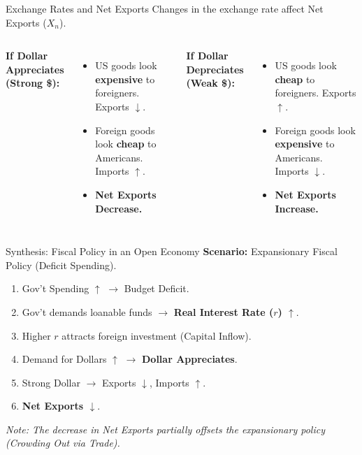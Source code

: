 \documentclass[aspectratio=169]{beamer}
\begin{document}
\begin{frame}{Exchange Rates and Net Exports}
    Changes in the exchange rate affect Net Exports ($X_n$).
    \vspace{0.5cm}
    \begin{columns}
        \textbf{If Dollar Appreciates (Strong \$):}
        \begin{itemize}
            \item US goods look \textbf{expensive} to foreigners. Exports $\downarrow$.
            \item Foreign goods look \textbf{cheap} to Americans. Imports $\uparrow$.
            \item \textbf{Net Exports Decrease.}
        \end{itemize}
        
        \textbf{If Dollar Depreciates (Weak \$):}
        \begin{itemize}
            \item US goods look \textbf{cheap} to foreigners. Exports $\uparrow$.
            \item Foreign goods look \textbf{expensive} to Americans. Imports $\downarrow$.
            \item \textbf{Net Exports Increase.}
        \end{itemize}
    \end{columns}
\end{frame}

\begin{frame}{Synthesis: Fiscal Policy in an Open Economy}
    \textbf{Scenario:} Expansionary Fiscal Policy (Deficit Spending).
    \vspace{0.3cm}
    \begin{enumerate}
        \item Gov't Spending $\uparrow$ $\rightarrow$ Budget Deficit.
        \item Gov't demands loanable funds $\rightarrow$ \textbf{Real Interest Rate ($r$) $\uparrow$}.
        \item Higher $r$ attracts foreign investment (Capital Inflow).
        \item Demand for Dollars $\uparrow$ $\rightarrow$ \textbf{Dollar Appreciates}.
        \item Strong Dollar $\rightarrow$ Exports $\downarrow$, Imports $\uparrow$.
        \item \textbf{Net Exports $\downarrow$}.
    \end{enumerate}
    \vspace{0.3cm}
    \textit{Note: The decrease in Net Exports partially offsets the expansionary policy (Crowding Out via Trade).}
\end{frame}
\end{document}
